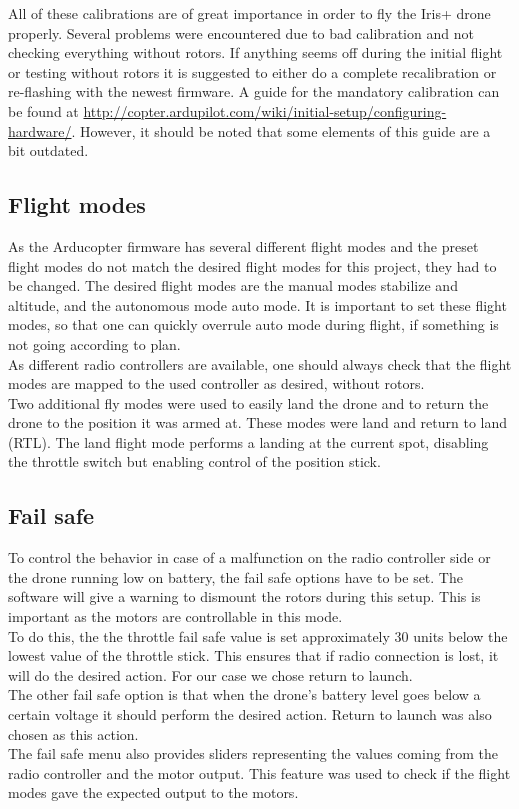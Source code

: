 All of these calibrations are of great importance in order to fly the Iris+ drone properly. Several
problems were encountered due to bad calibration and not checking everything without rotors. If
anything seems off during the initial flight or testing without rotors it is suggested to either do
a complete recalibration or re-flashing with the newest firmware. A guide for the mandatory
calibration can be found at
\url{http://copter.ardupilot.com/wiki/initial-setup/configuring-hardware/}.
However, it should be noted that some elements of this guide are a bit outdated.

\subsection*{Flight modes}
As the Arducopter firmware has several different flight modes and the preset flight modes do not
match the desired flight modes for this project, they had to be changed.
The desired flight modes
are the manual modes stabilize and altitude,
and the autonomous mode auto mode.
It is important
to set these flight modes, so that one can quickly overrule auto mode during flight,
if something is not going according to plan.\\
As different radio controllers are available, one should always check that the flight modes are
mapped to the used controller as desired, without rotors.\\
Two additional fly modes were used to easily land the drone and to return the drone to the position
it was armed at. These modes were land and return to land (RTL). The land flight mode performs a
landing at the current spot, disabling the throttle switch but enabling control of the position
stick.

\subsection*{Fail safe}
To control the behavior in case of a malfunction on the radio controller side or the drone running
low on battery, the fail safe options have to be set. The software will give a warning to dismount
the rotors during this setup. This is important as the motors are controllable in this mode.\\
To do this, the the throttle fail safe value is set approximately 30 units below the lowest value of the
throttle stick. This ensures that if radio connection is lost, it will do the desired action. For
our case we chose return to launch.\\
The other fail safe option is that when the drone's battery level goes below a certain voltage it should
perform the desired action. Return to launch was also chosen as this action.\\
The fail safe menu also provides sliders representing the values coming from the radio controller
and the motor output. This feature was used to check if the flight modes gave the expected output
to the motors.

